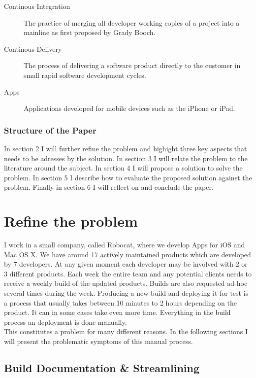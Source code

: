 \documentclass{ituthesis}
\begin{document}
\begin{description}
\item[Continous Integration] The practice of merging all developer working copies of a project into a mainline as first proposed by Grady Booch.
\item[Continous Delivery] The process of delivering a software product directly to the customer in small rapid software development cycles.
\item[Apps] Applications developed for mobile devices such as the iPhone or iPad.
\end{description}

\subsection{Structure of the Paper}

In section 2 I will further refine the problem and highight three key aspects that needs to be adresses by the solution. In section 3 I will relate the problem to the literature around the subject. In section 4 I will propose a solution to solve the problem. In section 5 I describe how to evaluate the proposed solution against the problem. Finally in section 6 I will reflect on and conclude the paper.

\chapter{Refine the problem}
\label{ch:refine_the_problem}

I work in a small company, called Robocat, where we develop Apps for iOS and Mac OS X. We have around 17 actively maintained products which are developed by 7 developers. At any given moment each developer may be involved with 2 or 3 different products. Each week the entire team and any potential clients needs to receive a weekly build of the updated products. Builds are also requested ad-hoc several times during the week. Producing a new build and deploying it for test is a process that usually takes between 10 minutes to 2 hours depending on the product. It can in some cases take even more time. Everything in the build process an deployment is done manually.\\

This constitutes a problem for many different reasons. In the following sections I will present the problematic symptoms of this manual process.

\section{Build Documentation \& Streamlining}
\end{document}
